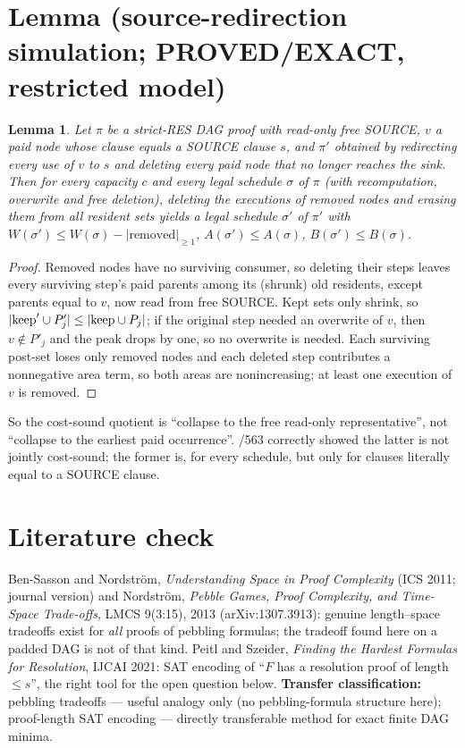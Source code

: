 \documentclass[10pt]{article}
\newtheorem{lemma}{Lemma}
\begin{document}
\section*{Lemma (source-redirection simulation; PROVED/EXACT, restricted model)}
\begin{lemma}
Let \(\pi\) be a strict-RES DAG proof with read-only free SOURCE, \(v\) a paid node whose clause equals a SOURCE clause \(s\), and \(\pi'\) obtained by
redirecting every use of \(v\) to \(s\) and deleting every paid node that no longer reaches the sink.  Then for every capacity \(c\) and every legal
schedule \(\sigma\) of \(\pi\) (with recomputation, overwrite and free deletion), deleting the executions of removed nodes and erasing them from all
resident sets yields a legal schedule \(\sigma'\) of \(\pi'\) with \(W(\sigma')\le W(\sigma)-|\text{removed}|_{\ge1}\), \(A(\sigma')\le A(\sigma)\), \(B(\sigma')\le B(\sigma)\).
\end{lemma}
\begin{proof}
Removed nodes have no surviving consumer, so deleting their steps leaves every surviving step's paid parents among its (shrunk) old residents, except
parents equal to \(v\), now read from free SOURCE.  Kept sets only shrink, so \(|{\rm keep}'\cup P'_j|\le|{\rm keep}\cup P_j|\); if the original step needed an
overwrite of \(v\), then \(v\notin P'_j\) and the peak drops by one, so no overwrite is needed.  Each surviving post-set loses only removed nodes and each
deleted step contributes a nonnegative area term, so both areas are nonincreasing; at least one execution of \(v\) is removed.
\end{proof}
So the cost-sound quotient is ``collapse to the free read-only representative'', not ``collapse to the earliest paid occurrence''.  /563 correctly
showed the latter is not jointly cost-sound; the former is, for every schedule, but only for clauses literally equal to a SOURCE clause.

\section*{Literature check}
Ben-Sasson and Nordstr\"om, \emph{Understanding Space in Proof Complexity} (ICS 2011; journal version) and Nordstr\"om, \emph{Pebble Games, Proof
Complexity, and Time-Space Trade-offs}, LMCS 9(3:15), 2013 (arXiv:1307.3913): genuine length--space tradeoffs exist for \emph{all} proofs of
pebbling formulas; the tradeoff found here on a padded DAG is not of that kind.  Peitl and Szeider, \emph{Finding the Hardest Formulas for
Resolution}, IJCAI 2021: SAT encoding of ``\(F\) has a resolution proof of length \(\le s\)'', the right tool for the open question below.
\textbf{Transfer classification:} pebbling tradeoffs --- useful analogy only (no pebbling-formula structure here); proof-length SAT encoding --- directly
transferable method for exact finite DAG minima.
\end{document}

